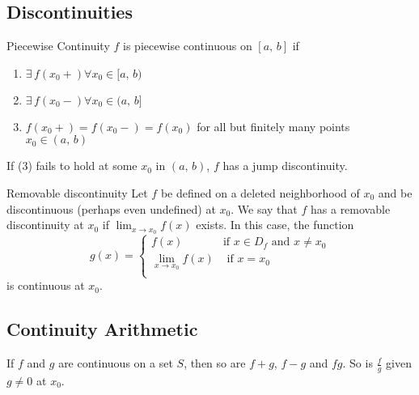 \documentclass{article}
\newcommand{\ex}{\exists\,}
\begin{document}
{{\subsection{Discontinuities}

\noindent\begin{definition}{Piecewise Continuity}{}
  $f$ is {\color{blue} piecewise continuous }on $[a,\,b]$ if
  \begin{enumerate}
    \item $\ex f(x_0+)\forall x_0\in[a,\,b)$
    \item $\ex f(x_0-)\forall x_0\in(a,\,b]$
    \item $f(x_0+) = f(x_0-) = f(x_0)$ for all but finitely many points $x_0\in (a,\,b)$
  \end{enumerate}
  If (3) fails to hold at some $x_0$ in $(a,\,b)$, $f$ has a {\color{blue}  jump discontinuity}.
\end{definition}\vspace{10pt}

\noindent\begin{definition}{Removable discontinuity}{}
Let $f$ be defined on a deleted neighborhood of $x_0$ and be discontinuous (perhaps even undefined) at $x_0$. We say that $f$ has a removable discontinuity at $x_0$ if $\lim_{x\to x_0}{f(x)}$ exists. In
this case, the function
$$g(x) = \begin{cases}
  f(x) & \text{if $x\in D_f$ and $x\neq x_0$} \\
  \lim_{x\to x_0}{f(x)} & \text{ if $x = x_0$}\\
\end{cases} $$
is continuous at $x_0$.
\end{definition}\vspace{10pt}

\subsection{Continuity Arithmetic}
\begin{theorem}{}{}
  If $f$ and $g$ are continuous on a set $S$, then so are $f + g$, $f - g$ and $fg$. So is $\displaystyle{\frac{f}{g}}$ given $g\neq 0$ at $x_0$.
\end{theorem}

}}
\end{document}
